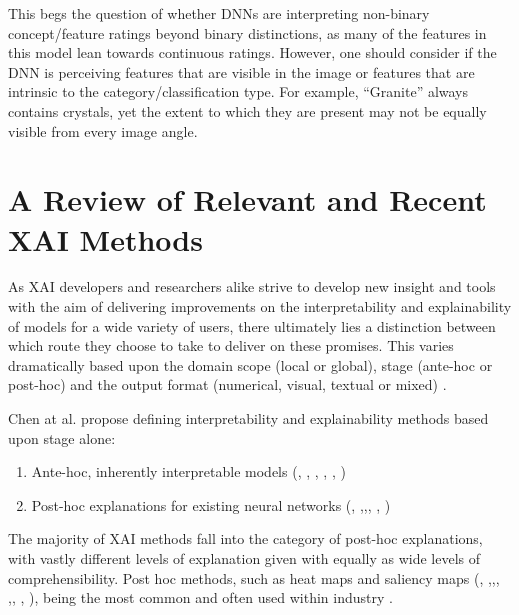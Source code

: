 This begs the question of whether DNNs are interpreting non-binary concept/feature ratings beyond binary distinctions, as many of the features in this model lean towards continuous ratings. However, one should consider if the DNN is perceiving features that are visible in the image or features that are intrinsic to the category/classification type. For example, “Granite” always contains crystals, yet the extent to which they are present may not be equally visible from every image angle.

\section{A Review of Relevant and Recent XAI Methods}

As XAI developers and researchers alike strive to develop new insight and tools with the aim of delivering improvements on the interpretability and explainability of models for a wide variety of users, there ultimately lies a distinction between which route they choose to take to deliver on these promises. This varies dramatically based upon the domain scope (local or global), stage (ante-hoc or post-hoc) and the output format (numerical, visual, textual or mixed) \cite{yangSurveyExplainableAI2023}.

Chen at al. \cite{chenConceptWhiteningInterpretable2020} propose defining interpretability and explainability methods based upon stage alone:
\begin{enumerate}
    \item Ante-hoc, inherently interpretable models (\cite{chenConceptWhiteningInterpretable2020}, \cite{kohConceptBottleneckModels2020}, \cite{havasiAddressingLeakageConcept2022a}, \cite{rudinInterpretableMachineLearning2021}, \cite{eltonSelfexplainingAIAlternative2020}, \cite{grangeXAISelfexplanatoryAI2022})
    \item Post-hoc explanations for existing neural networks (\cite{ribeiroWhyShouldTrust2016}, \cite{lundbergUnifiedApproachInterpreting2017},\cite{zeilerVisualizingUnderstandingConvolutional2014},\cite{simonyanDeepConvolutionalNetworks2014}, \cite{smilkovSmoothGradRemovingNoise2017}, \cite{selvarajuGradCAMVisualExplanations2017})
\end{enumerate}

The majority of XAI methods fall into the category of post-hoc explanations, with vastly different levels of explanation given with equally as wide levels of comprehensibility. Post hoc methods, such as heat maps and saliency maps (\cite{ribeiroWhyShouldTrust2016}, ,\cite{zeilerVisualizingUnderstandingConvolutional2014},\cite{simonyanDeepConvolutionalNetworks2014}, \cite{fongInterpretableExplanationsBlack2017},\cite{smilkovSmoothGradRemovingNoise2017}, \cite{selvarajuGradCAMVisualExplanations2017}, \cite{sundararajanAxiomaticAttributionDeep2017}), being the most common and often used within industry \cite{holzingerXxAIExplainableAI2022a}. 

